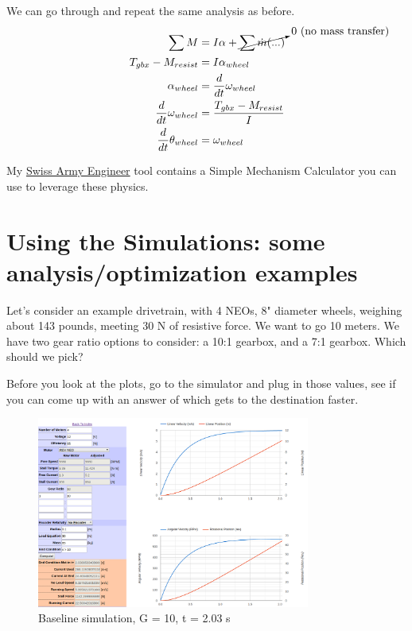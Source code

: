\documentclass[10pt,letterpaper]{book}
\begin{document}
	We can go through and repeat the same analysis as before.
	\begin{align}
		\sum M &= I \alpha + \cancelto{0 \ \mbox{(no mass transfer)}}{\sum \dot{m}(...)}  \\
		T_{gbx} - M_{resist} &= I \alpha_{wheel} \\
		\alpha_{wheel} &= \frac{d}{dt} \omega_{wheel} \\
		\frac{d}{dt} \omega_{wheel} &= \frac{T_{gbx} - M_{resist}}{I} \\
		\frac{d}{dt} \theta_{wheel} &= \omega_{wheel}
	\end{align}
	
	My \href{http://thaddeus-maximus.github.io/swissarmyengineer/}{\color{red}Swiss Army Engineer} tool contains a Simple Mechanism Calculator you can use to leverage these physics.

	
\section{Using the Simulations: some analysis/optimization examples}

Let's consider an example drivetrain, with 4 NEOs, 8" diameter wheels, weighing about 143 pounds, meeting 30 N of resistive force. We want to go 10 meters. We have two gear ratio options to consider: a 10:1 gearbox, and a 7:1 gearbox. Which should we pick?

Before you look at the plots, go to the simulator and plug in those values, see if you can come up with an answer of which gets to the destination faster.

\clearpage
	
	\begin{figure}[H] \centering
	\includegraphics[width=0.8\textwidth]{imgs/thsae_1.png}
	\caption{Baseline simulation, G = 10, t = 2.03 s}
	\end{figure}
	
\end{document}
